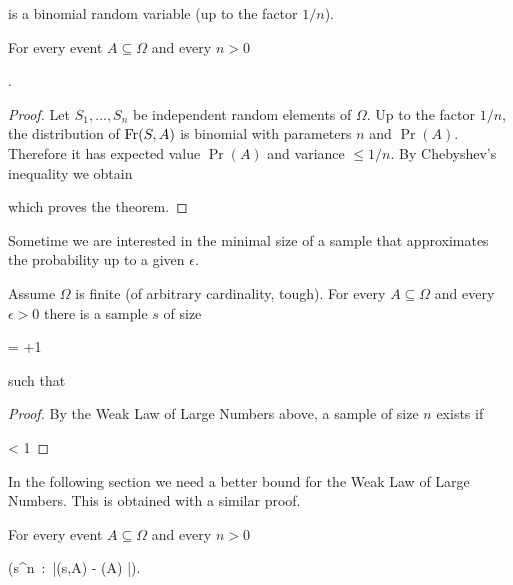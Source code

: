 \documentclass[scombinatorics.tex]{subfiles}
\begin{document}
is a binomial random variable (up to the factor $1/n$).

\begin{void_thm}
  For every event $A\subseteq\Omega$ and every $n>0$
  
  {\le}
  {.}
\end{void_thm}


\begin{proof}
  Let $S_1,\dots,S_n$ be independent random elements of $\Omega$.
  Up to the factor $1/n$, the distribution of $\mathop{\rm Fr}(S,A)$ is binomial with parameters $n$ and $\Pr(A)$.
  Therefore it has expected value $\Pr(A)$ and  variance $\le1/n$. 
  By Chebyshev's inequality we obtain 
  
  {\le}
  {}

  which proves the theorem.
\end{proof}

Sometime we are interested in the minimal size of a sample that approximates the probability up to a given $\epsilon$.

\begin{corollary}\label{corl_wlln}
  Assume $\Omega$ is finite (of arbitrary cardinality, tough).
  For every $A\subseteq\Omega$ and every $\epsilon>0$ there is a sample $s$ of size

      {=}
      {\left\lfloor{}+1\right\rfloor} 
      
  such that

\end{corollary}


\begin{proof}
  By the Weak Law of Large Numbers above, a sample of size $n$ exists if

      {<}
      {1}
\end{proof}

In the following section we need a better bound for the Weak Law of Large Numbers.
This is obtained with a similar proof.

\begin{void_thm}
  For every event $A\subseteq\Omega$ and every $n>0$
  
  {\ge}
  {\Pr \Big(s\in\Omega^n\ :\ \big|\Fr(s,A) - \Pr(A)  \big|\ge\epsilon\Big).}
\end{void_thm}
\end{document}
